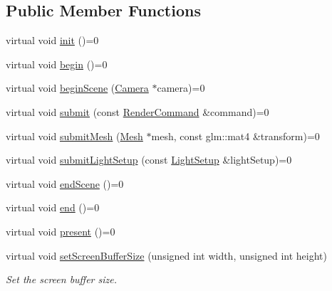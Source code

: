 \subsection*{Public Member Functions}
\begin{DoxyCompactItemize}
\item 
virtual void \hyperlink{classce_1_1graphics_1_1_renderer3_d_ae887bbdc74af40838e6d059d30bb430b}{init} ()=0
\item 
virtual void \hyperlink{classce_1_1graphics_1_1_renderer3_d_a51818b5b581c33001ddbbc6dff9d6e36}{begin} ()=0
\item 
virtual void \hyperlink{classce_1_1graphics_1_1_renderer3_d_a94e60931e0ff3f26b217db09a11ee7e6}{begin\+Scene} (\hyperlink{classce_1_1graphics_1_1_camera}{Camera} $\ast$camera)=0
\item 
virtual void \hyperlink{classce_1_1graphics_1_1_renderer3_d_a67e956930a17600cdcfc689aa624f990}{submit} (const \hyperlink{structce_1_1graphics_1_1_render_command}{Render\+Command} \&command)=0
\item 
virtual void \hyperlink{classce_1_1graphics_1_1_renderer3_d_aba7b0abfa0aad0d89a816923e83ef787}{submit\+Mesh} (\hyperlink{classce_1_1graphics_1_1_mesh}{Mesh} $\ast$mesh, const glm\+::mat4 \&transform)=0
\item 
virtual void \hyperlink{classce_1_1graphics_1_1_renderer3_d_a4a2eb6efe3adbff611c20141159eb3dc}{submit\+Light\+Setup} (const \hyperlink{structce_1_1graphics_1_1_light_setup}{Light\+Setup} \&light\+Setup)=0
\item 
virtual void \hyperlink{classce_1_1graphics_1_1_renderer3_d_a0b8feaf1dd7f6ee03c7be2197d012e25}{end\+Scene} ()=0
\item 
virtual void \hyperlink{classce_1_1graphics_1_1_renderer3_d_a4d35e07f42a4fb42ebe3f8e57bfcdb58}{end} ()=0
\item 
virtual void \hyperlink{classce_1_1graphics_1_1_renderer3_d_a7b258350b5af957550a2d29800d3c5b7}{present} ()=0
\item 
virtual void \hyperlink{classce_1_1graphics_1_1_renderer3_d_a39b5c5b8a62c71600d23de2d642e1546}{set\+Screen\+Buffer\+Size} (unsigned int width, unsigned int height)
\begin{DoxyCompactList}\small\item\em Set the screen buffer size. \end{DoxyCompactList}\end{DoxyCompactItemize}
